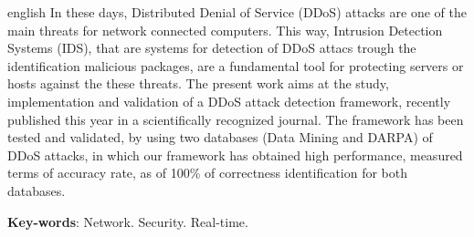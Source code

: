 \begin{resumo}[Abstract]
 \begin{otherlanguage*}{english}
 	In these days, Distributed Denial of Service (DDoS) attacks are one of the main threats for network connected computers. This way, Intrusion Detection Systems (IDS), that are systems for  detection of DDoS attacs trough the identification malicious packages, are a fundamental tool for protecting servers or hosts against the these threats. The present work aims at the study, implementation and validation of a DDoS attack detection framework, recently published this year in a scientifically recognized journal. The framework has been tested and validated, by using two databases (Data Mining and DARPA) of DDoS attacks, in which our framework has obtained high performance, measured terms of accuracy rate, as of 100\% of correctness identification for both databases.
   \noindent 
  
   \textbf{Key-words}: Network. Security. Real-time. 
 \end{otherlanguage*}
\end{resumo}